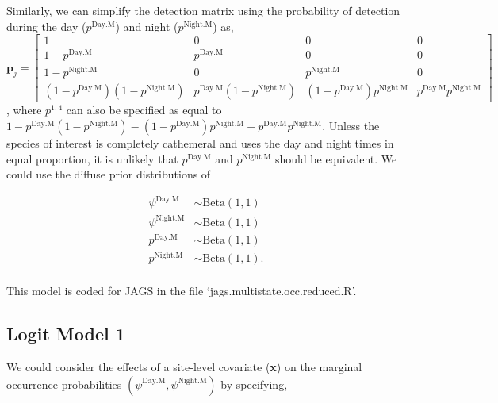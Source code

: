 \documentclass[12pt]{article}
\begin{document}
Similarly, we can simplify the detection matrix using the probability of detection during the day  ($p^{\text{Day.M}}$) and night ($p^{\text{Night.M}}$) as,
\vspace{10pt}
\begin{equation}
\boldsymbol{p}_{j} = \begin{bmatrix} 1 & 0 & 0 & 0 \\ 
									1-p^{\text{Day.M}} & p^{\text{Day.M}} & 0 & 0 \\ 
									1-p^{\text{Night.M}} & 0 & p^{\text{Night.M}} & 0\\
  								      (1-p^{\text{Day.M}})(1-p^{\text{Night.M}}) & p^{\text{Day.M}}(1-p^{\text{Night.M}}) & (1-p^{\text{Day.M}})p^{\text{Night.M}} & p^{\text{Day.M}}p^{\text{Night.M}}
  								      \end{bmatrix}
\end{equation}
, where $p^{1,4}$ can also be specified as equal to $1- p^{\text{Day.M}}(1-p^{\text{Night.M}}) - (1-p^{\text{Day.M}})p^{\text{Night.M}} - p^{\text{Day.M}}p^{\text{Night.M}}$. Unless the species of interest is completely cathemeral and uses the day and night times in equal proportion, it is unlikely that $p^{\text{Day.M}}$ and $p^{\text{Night.M}}$ should be equivalent. We could use the diffuse prior distributions of 
\begin{center}
\begin{align*}
\psi^{\text{Day.M}} &\sim \text{Beta}(1,1)\\
\psi^{\text{Night.M}} &\sim \text{Beta}(1,1)\\
p^{\text{Day.M}} &\sim \text{Beta}(1,1)\\
p^{\text{Night.M}} &\sim \text{Beta}(1,1).\\
\end{align*}
\end{center}
This model is coded for JAGS in the file `jags.multistate.occ.reduced.R'.

\subsection{Logit Model 1}
We could consider the effects of a site-level covariate (\textbf{x}) on the marginal occurrence probabilities $(\psi^{\text{Day.M}}, \psi^{\text{Night.M}})$ by specifying,
\end{document}
